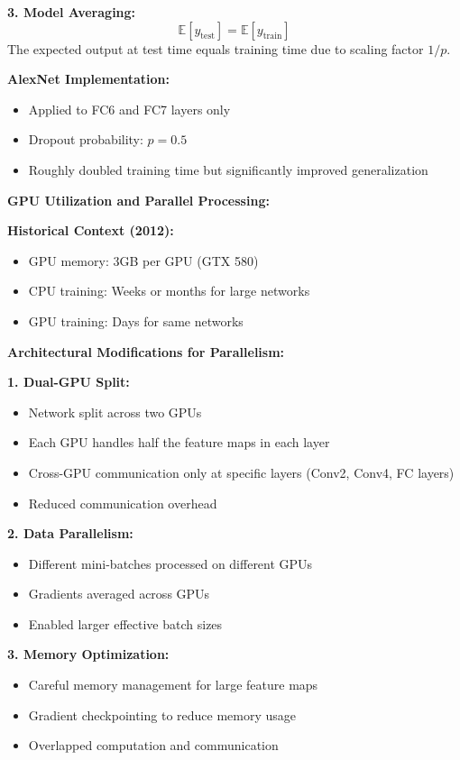 \documentclass[12pt]{article}
\begin{document}
\begin{enumerate}[(a)]
{    \textbf{3. Model Averaging:}
    $$\mathbb{E}[y_{\text{test}}] = \mathbb{E}[y_{\text{train}}]$$
    The expected output at test time equals training time due to scaling factor $1/p$.
    
    \textbf{AlexNet Implementation:}
    \begin{itemize}
        \item Applied to FC6 and FC7 layers only
        \item Dropout probability: $p = 0.5$
        \item Roughly doubled training time but significantly improved generalization
    \end{itemize}
    
    \textbf{GPU Utilization and Parallel Processing:}
    
    \textbf{Historical Context (2012):}
    \begin{itemize}
        \item GPU memory: 3GB per GPU (GTX 580)
        \item CPU training: Weeks or months for large networks
        \item GPU training: Days for same networks
    \end{itemize}
    
    \textbf{Architectural Modifications for Parallelism:}
    
    \textbf{1. Dual-GPU Split:}
    \begin{itemize}
        \item Network split across two GPUs
        \item Each GPU handles half the feature maps in each layer
        \item Cross-GPU communication only at specific layers (Conv2, Conv4, FC layers)
        \item Reduced communication overhead
    \end{itemize}
    
    \textbf{2. Data Parallelism:}
    \begin{itemize}
        \item Different mini-batches processed on different GPUs
        \item Gradients averaged across GPUs
        \item Enabled larger effective batch sizes
    \end{itemize}
    
    \textbf{3. Memory Optimization:}
    \begin{itemize}
        \item Careful memory management for large feature maps
        \item Gradient checkpointing to reduce memory usage
        \item Overlapped computation and communication
    \end{itemize}
    
}
\end{enumerate}
\end{document}
